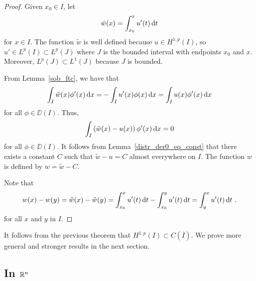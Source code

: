 \begin{proof}
Given $x_0 \in I$, let
\[
\tilde{w}(x) = \int_{x_0}^x u'(t) \,\mathrm{d}{t}
\]
for $x \in I$.  The function $\tilde{w}$ is well defined because
$\displaystyle u \in H^{1,p}(I)$, so
$\displaystyle u' \in L^p(I) \subset L^p(J)$
where $J$ is the bounded interval with endpoints $x_0$ and
$x$.  Moreover, $\displaystyle L^p(J) \subset L^1(J)$ because $J$ is bounded.

From Lemma~\ref{sob_ftc}, we have that
\[
\int_I \tilde{w}(x) \phi'(x) \,\mathrm{d}{x} = - \int_I u'(x) \phi(x) \,\mathrm{d}{x}
= \int_I u(x) \phi'(x) \,\mathrm{d}{x}
\]
for all $\phi \in \DD(I)$.  Thus,
\[
\int_I \left( \tilde{w}(x) - u(x)\right) \phi'(x) \,\mathrm{d}{x} = 0
\]
for all $\phi \in \DD(I)$.  It follows from
Lemma~\ref{distr_der0_eq_const} that there exists a constant $C$ such
that $\tilde{w} - u = C$ almost everywhere on $I$.  The function $w$
is defined by $w = \tilde{w} - C$.

Note that
\[
w(x) - w(y) = \tilde{w}(x) - \tilde{w}(y) =
\int_{x_0}^x u'(t) \,\mathrm{d}{t} - \int_{x_0}^y u'(t) \,\mathrm{d}{t}
= \int_y^x u'(t) \,\mathrm{d}{t} \ .
\]
for all $x$ and $y$ in $I$.
\end{proof}

It follows from the previous theorem that
$\displaystyle H^{1,p}(I) \subset C(\overline{I})$.  We prove more
general and stronger results in the next section.

\subsection{In $\mathbb{R}^n$}

